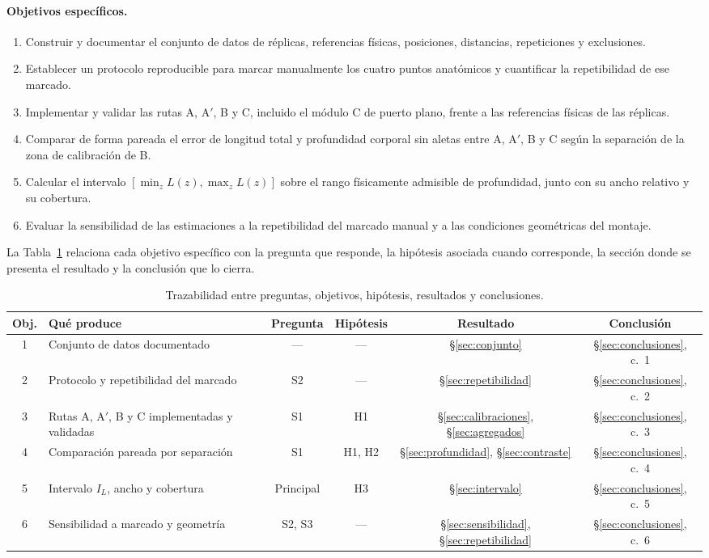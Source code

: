 \documentclass{report}
\newcommand{\Aprime}{A$'$}
\newcommand{\IL}{I_L}
\begin{document}
\paragraph{Objetivos específicos.}
\begin{enumerate}
  \item Construir y documentar el conjunto de datos de réplicas, referencias físicas, posiciones, distancias, repeticiones y exclusiones.
  \item Establecer un protocolo reproducible para marcar manualmente los cuatro puntos anatómicos y cuantificar la repetibilidad de ese marcado.
  \item Implementar y validar las rutas A, \Aprime, B y C, incluido el módulo C de puerto plano, frente a las referencias físicas de las réplicas.
  \item Comparar de forma pareada el error de longitud total y profundidad corporal sin aletas entre A, \Aprime, B y C según la separación de la zona de calibración de B.
  \item Calcular el intervalo $[\min_z L(z), \max_z L(z)]$ sobre el rango físicamente admisible de profundidad, junto con su ancho relativo y su cobertura.
  \item Evaluar la sensibilidad de las estimaciones a la repetibilidad del marcado manual y a las condiciones geométricas del montaje.
\end{enumerate}

La Tabla~\ref{tab:trazabilidad} relaciona cada objetivo específico con la pregunta que responde, la hipótesis asociada cuando corresponde, la sección donde se presenta el resultado y la conclusión que lo cierra.

\begin{table}[htbp]

\caption{Trazabilidad entre preguntas, objetivos, hipótesis, resultados y conclusiones.}
\label{tab:trazabilidad}
\begin{tabular}{@{}cp{4.6cm}cccc@{}}
\hline
Obj. & Qué produce & Pregunta & Hipótesis & Resultado & Conclusión \\
\hline
1 & Conjunto de datos documentado & --- & --- & §\ref{sec:conjunto} & §\ref{sec:conclusiones}, c.~1 \\
2 & Protocolo y repetibilidad del marcado & S2 & --- & §\ref{sec:repetibilidad} & §\ref{sec:conclusiones}, c.~2 \\
3 & Rutas A, \Aprime, B y C implementadas y validadas & S1 & H1 & §\ref{sec:calibraciones}, §\ref{sec:agregados} & §\ref{sec:conclusiones}, c.~3 \\
4 & Comparación pareada por separación & S1 & H1, H2 & §\ref{sec:profundidad}, §\ref{sec:contraste} & §\ref{sec:conclusiones}, c.~4 \\
5 & Intervalo $\IL$, ancho y cobertura & Principal & H3 & §\ref{sec:intervalo} & §\ref{sec:conclusiones}, c.~5 \\
6 & Sensibilidad a marcado y geometría & S2, S3 & --- & §\ref{sec:sensibilidad}, §\ref{sec:repetibilidad} & §\ref{sec:conclusiones}, c.~6 \\
\hline
\end{tabular}
\end{table}
\end{document}
